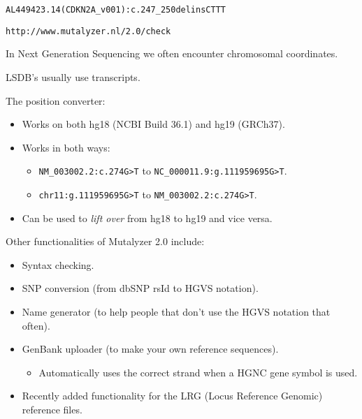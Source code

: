\documentclass[a4, portrait]{seminar}
\begin{document}
\begin{slide}

  \bigskip
  \bigskip
  \bigskip
  \bigskip
  \bigskip
  \begin{center}
    \texttt{AL449423.14(CDKN2A\_v001):c.247\_250delinsCTTT}

    \bigskip
    \texttt{http://www.mutalyzer.nl/2.0/check}
  \end{center}
  \vfill
\end{slide}

  
\begin{slide}

  In Next Generation Sequencing we often encounter chromosomal coordinates.

  LSDB's usually use transcripts.

  The position converter:
  \begin{itemize}
    \item Works on both hg18 (NCBI Build 36.1) and hg19 (GRCh37).
    \item Works in both ways:
    \begin{itemize}
      \item \texttt{NM\_003002.2:c.274\yellow G\white >\yellow T\white} to
            \texttt{NC\_000011.9:g.111959695\yellow G\white >\yellow T\white}.
      \item \texttt{chr11:g.111959695\yellow G\white >\yellow T\white} to 
            \texttt{NM\_003002.2:c.274\yellow G\white >\yellow T\white}.
    \end{itemize}
    \item Can be used to \emph{lift over} from hg18 to hg19 and vice versa.
  \end{itemize}

  \vfill
\end{slide}
  
\begin{slide}
  
  Other functionalities of Mutalyzer 2.0 include:
  \begin{itemize}
    \item Syntax checking.
    \item SNP conversion (from dbSNP rsId to HGVS notation).
    \item Name generator (to help people that don't use the HGVS notation that
          often).
    \item GenBank uploader (to make your own reference sequences).
    \begin{itemize}
      \item Automatically uses the correct strand when a HGNC gene symbol is
            used.
    \end{itemize}
    \item Recently added functionality for the LRG (Locus Reference Genomic)
          reference files.
  \end{itemize}
  \vfill
\end{slide}
\end{document}
